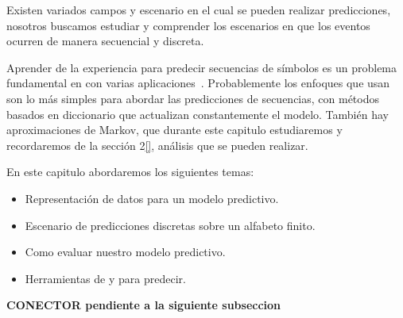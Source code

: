 Existen variados campos y escenario en el cual se pueden realizar predicciones, nosotros buscamos estudiar y comprender los escenarios en que los eventos ocurren de manera secuencial y discreta. 

Aprender de la experiencia para predecir secuencias de símbolos es un problema fundamental en \machinelearning con varias aplicaciones~\cite{Laird1994}. Probablemente los enfoques que usan \losslessdatacompression son lo más simples para abordar las predicciones de secuencias, con métodos basados en diccionario que actualizan constantemente el modelo. También hay aproximaciones de Markov, que durante este capitulo estudiaremos y recordaremos de la sección 2\ref{}, análisis que se pueden realizar.






En este capitulo abordaremos los siguientes temas:

\begin{itemize}
	\menorEspacioItemize
	\item Representación de datos para un modelo predictivo.
	\item Escenario de predicciones discretas sobre un alfabeto finito.
	\item Como evaluar nuestro modelo predictivo.
	\item Herramientas de \machinelearning y \losslessdatacompression para predecir.
\end{itemize}




\textbf{CONECTOR pendiente a la siguiente subseccion}